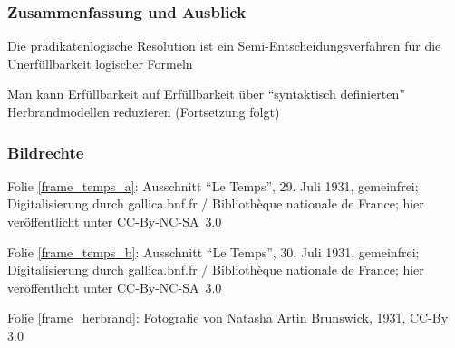 \documentclass[aspectratio=1610,onlymath]{beamer}
\begin{document}
\begin{frame}\frametitle{Zusammenfassung und Ausblick}

Die prädikatenlogische Resolution ist ein Semi-Entscheidungsverfahren für die Unerfüllbarkeit logischer Formeln\bigskip

Man kann Erfüllbarkeit auf Erfüllbarkeit über "`syntaktisch definierten"' Herbrandmodellen reduzieren
(Fortsetzung folgt)
% 

\bigskip


\end{frame}


\begin{frame}[t]\frametitle{Bildrechte}

Folie \ref{frame_temps_a}: Ausschnitt ``Le Temps'', 29. Juli 1931, gemeinfrei; Digitalisierung durch gallica.bnf.fr / Bibliothèque nationale de France; hier veröffentlicht unter CC-By-NC-SA~3.0
\medskip

Folie \ref{frame_temps_b}: Ausschnitt ``Le Temps'', 30. Juli 1931, gemeinfrei; Digitalisierung durch gallica.bnf.fr / Bibliothèque nationale de France; hier veröffentlicht unter CC-By-NC-SA~3.0
\medskip

Folie \ref{frame_herbrand}: Fotografie von Natasha Artin Brunswick, 1931, CC-By 3.0

\end{frame}
\end{document}
